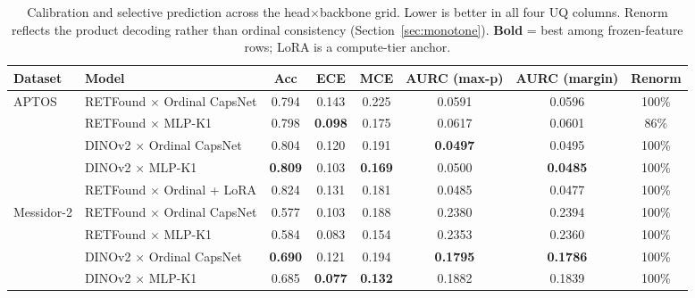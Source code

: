 \documentclass[journal]{IEEEtran}
\begin{document}
\begin{table}[!t]
    \caption{Calibration and selective prediction across the head$\times$backbone grid. Lower is better in all four UQ columns. Renorm reflects the product decoding rather than ordinal consistency (Section~\ref{sec:monotone}). \textbf{Bold} = best among frozen-feature rows; LoRA is a compute-tier anchor.}
    \label{tab:calibration}
    \centering
    \footnotesize
    \begin{tabular}{@{}llcccccc@{}}
        \toprule
        Dataset    & Model                             & Acc            & ECE            & MCE            & AURC (max-p)   & AURC (margin)  & Renorm \\
        \midrule
        APTOS      & RETFound $\times$ Ordinal CapsNet & 0.794           & 0.143           & 0.225           & 0.0591          & 0.0596          & 100\%  \\
                   & RETFound $\times$ MLP-K1          & 0.798           & \textbf{0.098}  & 0.175           & 0.0617          & 0.0601          & 86\%   \\
                   & DINOv2 $\times$ Ordinal CapsNet   & 0.804           & 0.120           & 0.191           & \textbf{0.0497} & 0.0495          & 100\%  \\
                   & DINOv2 $\times$ MLP-K1            & \textbf{0.809}  & 0.103           & \textbf{0.169}  & 0.0500          & \textbf{0.0485} & 100\%  \\
                   & RETFound $\times$ Ordinal + LoRA  & 0.824           & 0.131           & 0.181           & 0.0485          & 0.0477          & 100\%  \\
        \midrule
        Messidor-2 & RETFound $\times$ Ordinal CapsNet & 0.577           & 0.103           & 0.188           & 0.2380          & 0.2394          & 100\%  \\
                   & RETFound $\times$ MLP-K1          & 0.584           & 0.083           & 0.154           & 0.2353          & 0.2360          & 100\%  \\
                   & DINOv2 $\times$ Ordinal CapsNet   & \textbf{0.690}  & 0.121           & 0.194           & \textbf{0.1795} & \textbf{0.1786} & 100\%  \\
                   & DINOv2 $\times$ MLP-K1            & 0.685           & \textbf{0.077}  & \textbf{0.132}  & 0.1882          & 0.1839          & 100\%  \\
        \bottomrule
    \end{tabular}
\end{table}
\end{document}
